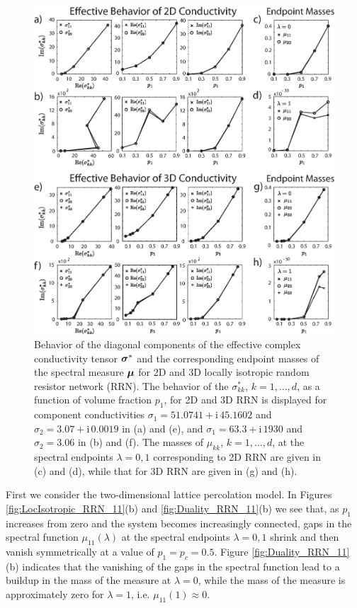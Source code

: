 \documentclass{cmslatex}
\newcommand{\I}{\mathrm{i}}
\newcommand\bsig{\mbox{\boldmath${\sigma}$}}
\newcommand\bmu{\mbox{\boldmath${\mu}$}}
\begin{document}
%
\begin{figure}[t]
  \centerline{\includegraphics[scale=0.6]{Effective_Parameter_Behavior.eps}} 
\caption{Behavior of the diagonal components of the effective complex
  conductivity tensor $\bsig^*$ and the corresponding endpoint masses
  of the spectral measure $\bmu$ for 2D and 3D locally isotropic
  random resistor network (RRN). The behavior of the $\sigma^*_{kk}$,
  $k=1,\ldots,d$, as a function of volume fraction $p_1$, for 2D and 3D RRN
  is displayed for component conductivities $\sigma_1=51.0741+\I\,45.1602$
  and $\sigma_2=3.07+\I\,0.0019$ in (a) and (e), and $\sigma_1=63.3+\I\,1930$ and
  $\sigma_2=3.06$ in (b) and (f). The masses of $\mu_{kk}$, $k=1,\ldots,d$, at the
  spectral endpoints $\lambda=0,1$ corresponding to 2D RRN are given in (c)
  and (d), while that for 3D RRN are given in (g) and (h). 
        }
\label{fig:Effective_Parameter_Behavior}
\end{figure}
%







First we consider the two-dimensional lattice percolation model. In
Figures \ref{fig:LocIsotropic_RRN_11}(b) and
\ref{fig:Duality_RRN_11}(b) we see that, as $p_1$ increases from zero 
and the system becomes increasingly connected, gaps in the spectral
function $\mu_{11}(\lambda)$ at the spectral endpoints $\lambda=0,1$ shrink and then
vanish  symmetrically at a value of $p_1=p_c=0.5$. Figure
\ref{fig:Duality_RRN_11}(b) indicates that the vanishing of the gaps
in the spectral function lead to a buildup in the mass of the measure at
$\lambda=0$, while the mass of the measure is approximately zero for $\lambda=1$,
i.e. $\mu_{11}(1)\approx0$.
\end{document}
